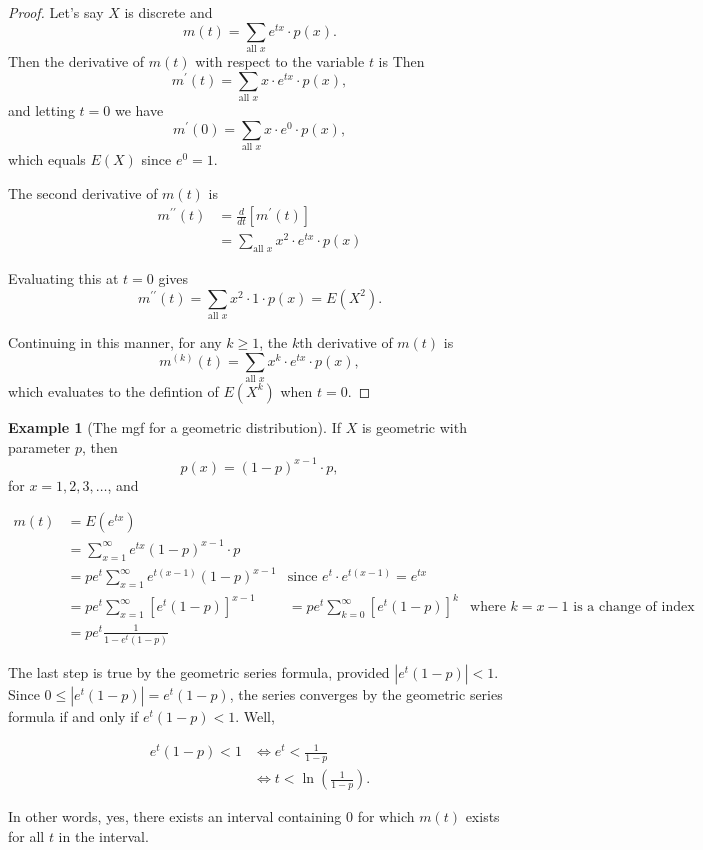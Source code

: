\documentclass[
]{book}
\theoremstyle{definition}
\theoremstyle{definition}
\newtheorem{example}{Example}[chapter]
\theoremstyle{definition}
\theoremstyle{definition}
\theoremstyle{remark}
\begin{document}
\begin{proof}
Let's say \(X\) is discrete and \[m(t) = \sum_{\text{all }x} e^{tx}\cdot p(x).\]
Then the derivative of \(m(t)\) with respect to the variable \(t\) is
Then \[m^\prime(t) = \sum_{\text{all }x} x\cdot e^{tx}\cdot p(x),\]
and letting \(t = 0\) we have
\[m^\prime(0) = \sum_{\text{all }x} x\cdot e^{0}\cdot p(x),\] which equals \(E(X)\) since \(e^0 = 1\).

The second derivative of \(m(t)\) is
\begin{align*}
m^{\prime\prime}(t) &= \frac{d}{dt}\left[m^\prime(t)\right]\\
  &=\sum_{\text{all }x} x^2\cdot e^{tx}\cdot p(x)
\end{align*}

Evaluating this at \(t = 0\) gives \[m^{\prime\prime}(t)=\sum_{\text{all }x} x^2\cdot 1 \cdot p(x) = E(X^2).\]

Continuing in this manner, for any \(k \geq 1\), the \(k\)th derivative of \(m(t)\) is \[m^{(k)}(t)=\sum_{\text{all }x} x^k\cdot e^{tx}\cdot p(x),\] which evaluates to the defintion of \(E(X^k)\) when \(t = 0\).
\end{proof}

\begin{example}[The mgf for a geometric distribution]
\protect\hypertarget{exm:mgf-geometric}{}\label{exm:mgf-geometric}If \(X\) is geometric with parameter \(p\), then \[p(x) = (1-p)^{x-1}\cdot p,\] for \(x = 1, 2, 3, \ldots\), and

\begin{align*}
m(t) &= E(e^{tx})\\
  &= \sum_{x = 1}^\infty e^{tx}(1-p)^{x-1}\cdot p\\
  &= pe^t \sum_{x=1}^\infty e^{t(x-1)}(1-p)^{x-1} &\text{since }e^t\cdot e^{t(x-1)} = e^{tx}\\
  &= pe^t \sum_{x=1}^\infty[e^t(1-p)]^{x-1}
  &= pe^t \sum_{k=0}^\infty[e^t(1-p)]^{k} &\text{where }k=x-1 \text{ is a change of index}\\
  &= pe^t\frac{1}{1-e^t(1-p)} 
\end{align*}

The last step is true by the geometric series formula, provided \(|e^t(1-p)|<1\).
Since \(0\leq |e^t(1-p)| = e^t(1-p)\), the series converges by the geometric series formula if and only if \(e^t(1-p) < 1\). Well,

\begin{align*}
e^t(1-p) < 1 &\iff e^t < \frac{1}{1-p} \\
 &\iff t < \ln\left(\frac{1}{1-p}\right).
\end{align*}

In other words, yes, there exists an interval containing 0 for which \(m(t)\) exists for all \(t\) in the interval.
\end{example}
\end{document}
